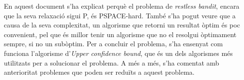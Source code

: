 
	En aquest document s'ha explicat perquè el problema de \textit{restless bandit}, encara que la seva relaxació sigui
	P, és PSPACE-hard. També s'ha pogut veure que a causa de la seva complexitat, un algorisme que retorni un
	resultat òptim és poc convenient, pel que és millor tenir un algorisme que no el resolgui òptimament sempre, si no un
	subòptim. Per a concluir el problema, s'ha ensenyat com funciona l'algorisme d'\textit{Upper confidence bound},
	que és un dels algorismes més utilitzats per a solucionar el problema. A més a més, s'ha comentat amb anterioritat
	problemes que poden ser reduïts a aquest problema. 
